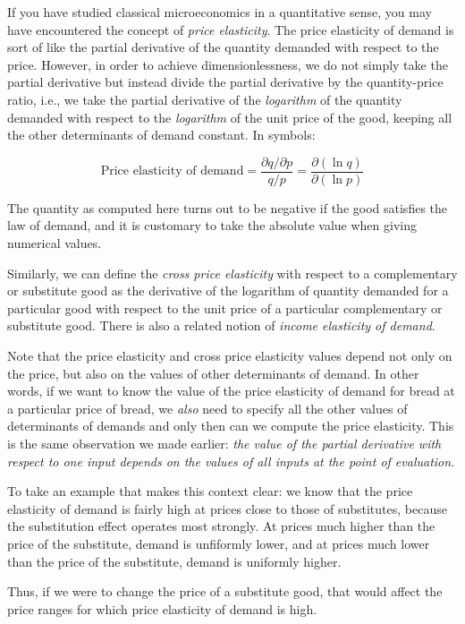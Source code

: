 \documentclass[10pt]{amsart}
\begin{document}
If you have studied classical microeconomics in a quantitative sense,
you may have encountered the concept of {\em price elasticity}. The
price elasticity of demand is sort of like the partial derivative of
the quantity demanded with respect to the price. However, in order to
achieve dimensionlessness, we do not simply take the partial
derivative but instead divide the partial derivative by the
quantity-price ratio, i.e., we take the partial derivative of the {\em
logarithm} of the quantity demanded with respect to the {\em
logarithm} of the unit price of the good, keeping all the other
determinants of demand constant. In symbols:

$$\text{Price elasticity of demand} = \frac{\partial q/\partial p}{q/p} = \frac{\partial (\ln q)}{\partial (\ln p)}$$

The quantity as computed here turns out to be negative if the good
satisfies the law of demand, and it is customary to take the absolute
value when giving numerical values.

Similarly, we can define the {\em cross price elasticity} with respect
to a complementary or substitute good as the derivative of the
logarithm of quantity demanded for a particular good with respect to
the unit price of a particular complementary or substitute good. There
is also a related notion of {\em income elasticity of demand}.

Note that the price elasticity and cross price elasticity values
depend not only on the price, but also on the values of other
determinants of demand. In other words, if we want to know the value
of the price elasticity of demand for bread at a particular price of
bread, we {\em also} need to specify all the other values of
determinants of demands and only then can we compute the price
elasticity. This is the same observation we made earlier: {\em the
value of the partial derivative with respect to one input depends on
the values of all inputs at the point of evaluation}. 

To take an example that makes this context clear: we know that the
price elasticity of demand is fairly high at prices close to those of
substitutes, because the substitution effect operates most
strongly. At prices much higher than the price of the substitute,
demand is unfiformly lower, and at prices much lower than the price of
the substitute, demand is uniformly higher.

Thus, if we were to change the price of a substitute good, that would
affect the price ranges for which price elasticity of demand is high.
\end{document}
